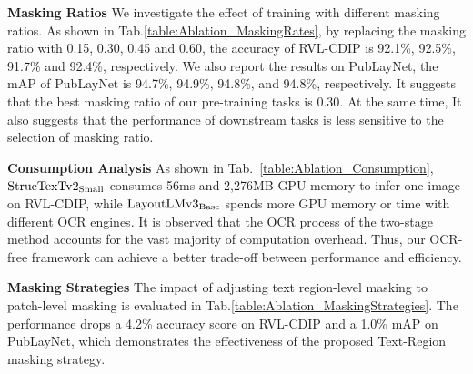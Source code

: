 \documentclass{article} %
\begin{document}
\noindent\textbf{Masking Ratios} We investigate the effect of training with different masking ratios. As shown in Tab.\ref{table:Ablation_MaskingRates}, by replacing the masking ratio with 0.15, 0.30, 0.45 and 0.60, the accuracy of RVL-CDIP is 92.1\%, 92.5\%, 91.7\% and 92.4\%, respectively. We also report the results on PubLayNet, the mAP of PubLayNet is 94.7\%, 94.9\%, 94.8\%, and 94.8\%, respectively. It suggests that the best masking ratio of our pre-training tasks is 0.30. At the same time, It also suggests that the performance of downstream tasks is less sensitive to the selection of masking ratio.

\noindent\textbf{Consumption Analysis} As shown in Tab.~\ref{table:Ablation_Consumption}, $\rm StrucTexTv2_{Small}$ consumes 56ms and 2,276MB GPU memory to infer one image on RVL-CDIP, while $\rm LayoutLMv3_{Base}$ spends more GPU memory or time with different OCR engines. It is observed that the OCR process of the two-stage method accounts for the vast majority of computation overhead. Thus, our OCR-free framework can achieve a better trade-off between performance and efficiency.

\noindent\textbf{Masking Strategies} The impact of adjusting text region-level masking to patch-level masking is evaluated in Tab.\ref{table:Ablation_MaskingStrategies}. The performance drops a 4.2\% accuracy score on RVL-CDIP and a 1.0\% mAP on PubLayNet, which demonstrates the effectiveness of the proposed Text-Region masking strategy.

\begin{table}[ht]
\caption{Comparison between performance of different masking strategies on RVL-CDIP and PubLayNet. The model is only pre-trained with the MIM task.}
\label{table:Ablation_MaskingStrategies}
\vspace{-1em}
\begin{center}
\end{center}
\vspace{-1em}
\end{table}
\end{document}
